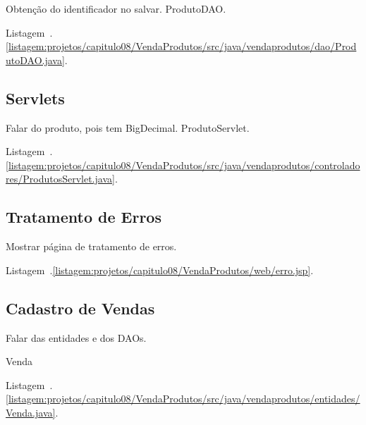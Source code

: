 
Obtenção do identificador no salvar. ProdutoDAO.

Listagem~\thechapter.\ref{listagem:projetos/capitulo08/VendaProdutos/src/java/vendaprodutos/dao/ProdutoDAO.java}.



\subsection{Servlets}

Falar do produto, pois tem BigDecimal. ProdutoServlet.

Listagem~\thechapter.\ref{listagem:projetos/capitulo08/VendaProdutos/src/java/vendaprodutos/controladores/ProdutosServlet.java}.


\subsection{Tratamento de Erros}

Mostrar página de tratamento de erros.

Listagem~\thechapter.\ref{listagem:projetos/capitulo08/VendaProdutos/web/erro.jsp}.



\subsection{Cadastro de Vendas}

Falar das entidades e dos DAOs.

Venda

Listagem~\thechapter.\ref{listagem:projetos/capitulo08/VendaProdutos/src/java/vendaprodutos/entidades/Venda.java}.

